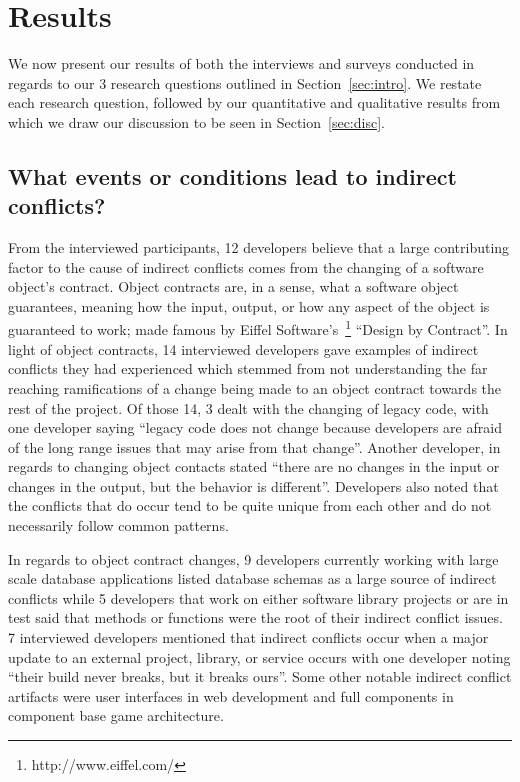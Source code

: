\documentclass[conference]{IEEEtran}
\begin{document}
\section{Results}
\label{sec:results}

We now present our results of both the interviews and surveys conducted in regards to our 3 research questions
outlined in Section~\ref{sec:intro}. We restate each research question, followed by our quantitative and qualitative
results from which we draw our discussion to be seen in Section~\ref{sec:disc}.

\subsection{What events or conditions lead to indirect conflicts?}

From the interviewed participants, 12 developers believe that a large contributing factor to the cause
of indirect conflicts comes from the changing of a software object's contract. Object contracts are, in a sense,
what a software object guarantees, meaning how the input, output, or how any aspect of the object is guaranteed
to work; made famous by Eiffel Software's~\footnote{http://www.eiffel.com/} ``Design by Contract''\texttrademark. 
In light of object contracts, 14 interviewed developers gave examples of indirect conflicts they had experienced
which stemmed from not understanding the far reaching ramifications of a change being made to an object contract
towards the rest of the project. Of those 14, 3 dealt
with the changing of legacy code, with one developer saying ``legacy code does not change because developers 
are afraid of the long range issues that may arise from that change''. Another developer, in regards to changing
object contacts stated ``there are no changes in the input or changes in the output, but the behavior is different''.
Developers also noted that the conflicts that do occur tend to be quite unique from each other and do not necessarily
follow common patterns.

In regards to object contract changes, 9 developers currently working with large scale database applications listed database
schemas as a large source of indirect conflicts while 5 developers that work on either software
library projects or are in test said that methods or functions were the root of their indirect conflict issues. 
7 interviewed developers mentioned that indirect conflicts occur when a major update to an external project, 
library, or service occurs with one developer noting ``their build never breaks, but it breaks ours''. Some
other notable indirect conflict artifacts were user interfaces in web development and full components in component 
base game architecture. 
\end{document}
